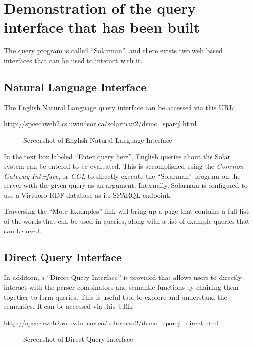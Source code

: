 \documentclass[../main.tex]{subfiles}
\begin{document}
\chapter{Demonstration of the query interface that has been built}

The query program is called ``Solarman'', and there exists two web based interfaces that can be used to interact with it.

\section{Natural Language Interface}

The English Natural Language query interface can be accessed via this URL:

\url{http://speechweb2.cs.uwindsor.ca/solarman2/demo_sparql.html}


\begin{figure}[h]
\centering
{}
\caption{Screenshot of English Natural Language Interface}
\end{figure}
In the text box labeled ``Enter query here'', English queries about the Solar system can be entered to be evaluated.  This is accomplished using the {\em Common Gateway Interface}, or {\em CGI}, to directly execute the ``Solarman'' program on the server with the given query as an argument.  Internally, Solarman is configured to use a Virtuoso\cite{virtuoso} RDF database as its SPARQL endpoint.

Traversing the ``More Examples'' link will bring up a page that contains a full list of the words that can be used in queries, along with a list of example queries that can be used.


\section{Direct Query Interface}

In addition, a ``Direct Query Interface'' is provided that allows users to directly interact with the parser combinators and semantic functions by chaining them together to form queries.  This is useful tool to explore and understand the semantics.  It can be accessed via this URL:

\url{http://speechweb2.cs.uwindsor.ca/solarman2/demo_sparql_direct.html}

\begin{figure}[h]
	\centering
	\caption{Screenshot of Direct Query Interface}
\end{figure}
\end{document}
